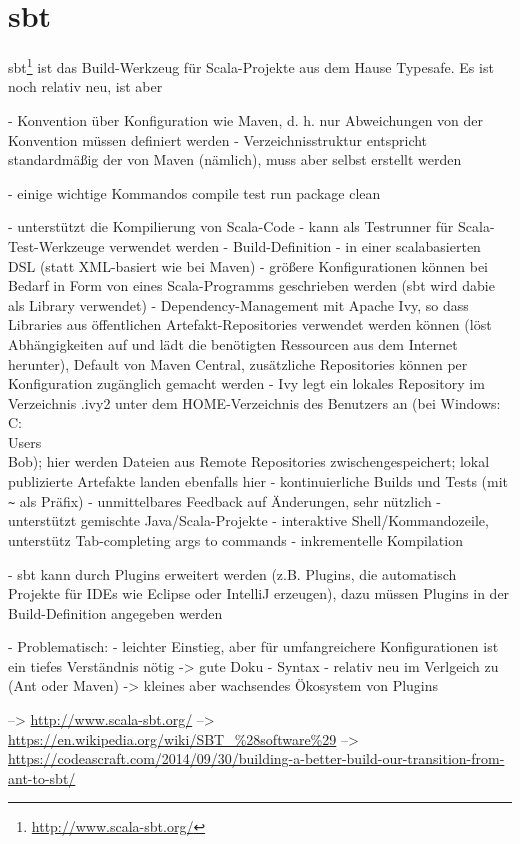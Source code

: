 \documentclass[a4paper, 12pt, hidelinks, listof=totoc, listoftables=totoc, bibliography=totoc]{scrreprt}
\begin{document}
\section{sbt}

sbt\footnote{\url{http://www.scala-sbt.org/}} ist das Build-Werkzeug für Scala-Projekte aus dem Hause Typesafe. Es ist noch relativ neu, ist aber 

- Konvention über Konfiguration wie Maven, d. h. nur Abweichungen von der Konvention müssen definiert werden
- Verzeichnisstruktur entspricht standardmäßig der von Maven (nämlich), muss aber selbst erstellt werden

- einige wichtige Kommandos
	compile
	test
	run
	package
	clean

- unterstützt die Kompilierung von Scala-Code
- kann als Testrunner für Scala-Test-Werkzeuge verwendet werden
- Build-Definition
	- in einer scalabasierten DSL (statt XML-basiert wie bei Maven)
	- größere Konfigurationen können bei Bedarf in Form von eines Scala-Programms geschrieben werden (sbt wird dabie als Library verwendet)
- Dependency-Management mit Apache Ivy, so dass Libraries aus öffentlichen Artefakt-Repositories verwendet werden können (löst Abhängigkeiten auf und lädt die benötigten Ressourcen aus dem Internet herunter), Default von Maven Central, zusätzliche Repositories können per Konfiguration zugänglich gemacht werden
	- Ivy legt ein lokales Repository im Verzeichnis .ivy2 unter dem HOME-Verzeichnis des Benutzers an (bei Windows: C:\\Users\\Bob); hier werden Dateien aus Remote Repositories zwischengespeichert; lokal publizierte Artefakte landen ebenfalls hier
- kontinuierliche Builds und Tests (mit \texttt{\textasciitilde} als Präfix) - unmittelbares Feedback auf Änderungen, sehr nützlich
- unterstützt gemischte Java/Scala-Projekte
- interaktive Shell/Kommandozeile, unterstütz Tab-completing args to commands
- inkrementelle Kompilation

- sbt kann durch Plugins erweitert werden (z.B. Plugins, die automatisch Projekte für IDEs wie Eclipse oder IntelliJ erzeugen), dazu müssen Plugins in der Build-Definition angegeben werden

- Problematisch:
	- leichter Einstieg, aber für umfangreichere Konfigurationen ist ein tiefes Verständnis nötig -> gute Doku
	- Syntax
	- relativ neu im Verlgeich zu (Ant oder Maven) -> kleines aber wachsendes Ökosystem von Plugins

-->  \url{http://www.scala-sbt.org/}
-->  \url{https://en.wikipedia.org/wiki/SBT_%28software%29}
-->  \url{https://codeascraft.com/2014/09/30/building-a-better-build-our-transition-from-ant-to-sbt/}
\end{document}
